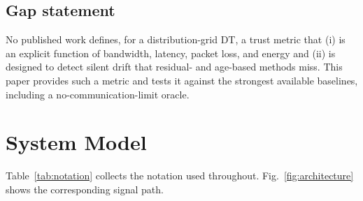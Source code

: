 \documentclass[journal]{IEEEtran}
\theoremstyle{plain}
\theoremstyle{definition}
\theoremstyle{remark}
\begin{document}
\subsection{Gap statement}
No published work defines, for a distribution-grid DT, a trust metric that
(i) is an explicit function of bandwidth, latency, packet loss, and energy
and (ii) is designed to detect silent drift that residual- and age-based
methods miss. This paper provides such a metric and tests it against the
strongest available baselines, including a no-communication-limit oracle.

\section{System Model}
\label{sec:model}

Table~\ref{tab:notation} collects the notation used throughout.
Fig.~\ref{fig:architecture} shows the corresponding signal path.
\end{document}
